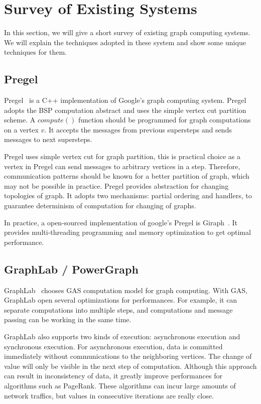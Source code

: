 \section{Survey of Existing Systems} \label{systems}
In this section, we will give a short survey of existing graph computing
systems. We will explain the techniques adopted in these system and
show some unique techniques for them.

\subsection{Pregel}
Pregel~\cite{pregel} is a C++ implementation of Google's graph computing system.
Pregel adopts the BSP computation abstract and uses the simple vertex cut
partition scheme. A $compute()$ function should be programmed for
graph computations on a vertex $v$. It accepts the messages from previous
supersteps and sends messages to next supersteps.

Pregel uses simple vertex cut for graph partition, this is practical
choice as a vertex in Pregel can send messages to arbitrary vertices
in a step. Therefore, communication patterns should be known for
a better partition of graph, which may not be possible in practice.
Pregel provides abstraction for changing topologies of graph.
It adopts two mechanisms: partial ordering and handlers, to guarantee
determinism of computation for changing of graphs.

In practice, a open-sourced implementation of google's Pregel is
Giraph~\cite{giraph}. It provides multi-threading programming and
memory optimization to get optimal performance.

\subsection{GraphLab / PowerGraph}
GraphLab~\cite{graphlab} chooses GAS computation model for graph
computing. With GAS, GraphLab open several optimizations
for performances. For example, it can separate computations
into multiple steps, and computations and message passing
can be working in the same time.

GraphLab also supports two kinds of execution: asynchronous
execution and synchronous execution.
For asynchronous execution, data is committed immediately
without communications to the neighboring vertices.
The change of value will only be visible in the next step
of computation. Although this approach can result in
inconsistency of data, it greatly improve performances
for algorithms such as PageRank. These algorithms
can incur large amounts of network traffics, but
values in consecutive iterations are really close.

